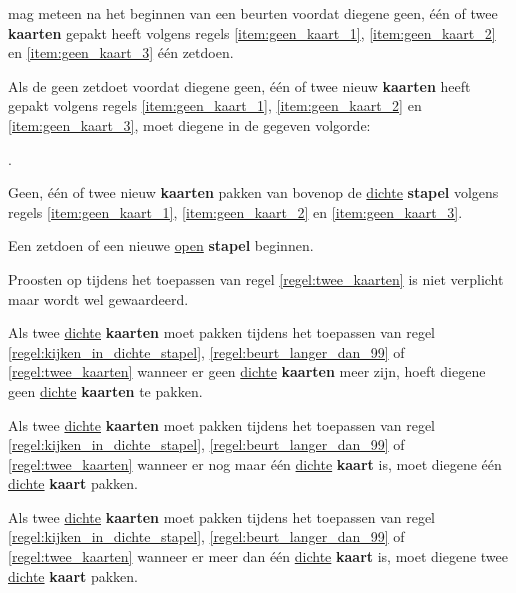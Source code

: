 \vervolgLijst{}
\item \EenSpeler mag meteen na het beginnen van een beurt\footnotemark[1] en voordat diegene geen, \'e\'en of twee \textbf{kaarten} gepakt heeft volgens regels \ref{item:geen_kaart_1}, \ref{item:geen_kaart_2} en \ref{item:geen_kaart_3} \'e\'en zet\footnotemark[3] doen.
\label{regel:zet_zonder_pakker}
\eindLijst{}

\vervolgLijst{}
\item \label{regel:twee_kaarten} Als de \huidigeSpeler geen zet\footnotemark[3] doet voordat diegene geen, \'e\'en of twee nieuw \textbf{kaarten} heeft gepakt volgens regels \ref{item:geen_kaart_1}, \ref{item:geen_kaart_2} en \ref{item:geen_kaart_3}, moet diegene in de gegeven volgorde:
\puntLijst{}
\item \FritsenN\footnotemark[4].
\item Geen, \'e\'en of twee nieuw \textbf{kaarten} pakken van bovenop de \ul{dichte} \textbf{stapel} volgens regels \ref{item:geen_kaart_1}, \ref{item:geen_kaart_2} en \ref{item:geen_kaart_3}.
\item Een zet\footnotemark[3] doen of een nieuwe \ul{open} \textbf{stapel} beginnen.
\eindPuntLijst{}
\label{regel:fritsen_en_kaarten_pakken}
\eindLijst{}

\vervolgLijst{}
\item Proosten op  tijdens het toepassen van regel \ref{regel:twee_kaarten} is niet verplicht maar wordt wel gewaardeerd.
\eindLijst{}

\vervolgLijst{}
\item Als \eenSpeler twee \ul{dichte} \textbf{kaarten} moet pakken tijdens het toepassen van regel \ref{regel:kijken_in_dichte_stapel}, \ref{regel:beurt_langer_dan_99} of \ref{regel:twee_kaarten} wanneer er geen \ul{dichte} \textbf{kaarten} meer zijn, hoeft diegene geen \ul{dichte} \textbf{kaarten} te pakken.
\label{item:geen_kaart_1}
\eindLijst{}

\vervolgLijst{}
\item Als \eenSpeler twee \ul{dichte} \textbf{kaarten} moet pakken tijdens het toepassen van regel \ref{regel:kijken_in_dichte_stapel}, \ref{regel:beurt_langer_dan_99} of \ref{regel:twee_kaarten} wanneer er nog maar \'e\'en \ul{dichte} \textbf{kaart} is, moet diegene \'e\'en \ul{dichte} \textbf{kaart} pakken.
\label{item:geen_kaart_2}
\eindLijst{}

\vervolgLijst{}
\item Als \eenSpeler twee \ul{dichte} \textbf{kaarten} moet pakken tijdens het toepassen van regel \ref{regel:kijken_in_dichte_stapel}, \ref{regel:beurt_langer_dan_99} of \ref{regel:twee_kaarten} wanneer er meer dan \'e\'en \ul{dichte} \textbf{kaart} is, moet diegene twee \ul{dichte} \textbf{kaart} pakken.
\label{item:geen_kaart_3}
\eindLijst{}

